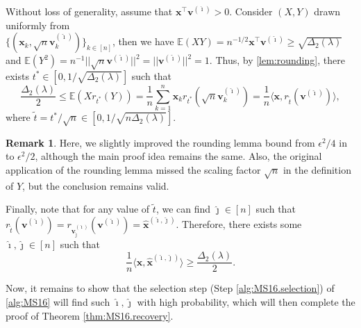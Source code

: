 \documentclass[11pt, titlepage]{article} %
\numberwithin{equation}{section}
\theoremstyle{definition}
\newtheorem{remark}{Remark}
\numberwithin{theorem}{section}
\numberwithin{lemma}{section}
\numberwithin{corollary}{section}
\numberwithin{proposition}{section}
\numberwithin{definition}{section}
\numberwithin{remark}{section}
\begin{document}
Without loss of generality, assume that $\bm{x}^\top \bm{v}^{(\hat{\imath})} > 0$. Consider $(X, Y)$ drawn uniformly from \\
$\{(\bm{x}_k, \sqrt{n}\bm{v}^{(\hat{\imath})}_k)\}_{k \in [n]}$, then
we have $\mathbb{E}(XY) = n^{-1/2} \bm{x}^\top \bm{v}^{(\hat{\imath})} \geq \sqrt{\Delta_2(\lambda)}$
and $\mathbb{E}(Y^2) = n^{-1} || \sqrt{n}\bm{v}^{(\hat{\imath})} ||^2 = || \bm{v}^{(\hat{\imath})} ||^2 = 1.$
Thus, by \cref{lem:rounding}, there exists $t^* \in [0, 1/\sqrt{\Delta_2(\lambda)}]$ such that
\[
\frac{\Delta_2(\lambda)}{2} \leq \mathbb{E}(X r_{t^*}(Y))
= \frac{1}{n} \sum_{k=1}^{n} \bm{x}_k r_{t^*}(\sqrt{n}\bm{v}^{(\hat{\imath})}_k)
= \frac{1}{n} \langle \bm{x}, r_{\tilde{t}}(\bm{v}^{(\hat{\imath})}) \rangle,
\]
where $\tilde{t} = t^*/\sqrt{n} \in [0, 1/\sqrt{n\Delta_2(\lambda)}]$. 
\begin{remark}
Here, we slightly improved the rounding lemma bound from $\epsilon^2/4$ in \cite{MS16} to $\epsilon^2/2$,
although the main proof idea remains the same. Also, the original application of the rounding lemma
missed the scaling factor $\sqrt{n}$ in the definition of $Y$, but the conclusion remains valid.
\end{remark}
Finally, note that for any value of $\tilde{t}$, we can find $\hat{\jmath} \in [n]$ such that 
$r_{\tilde{t}}(\bm{v}^{(\hat{\imath})}) = r_{\bm{v}^{(\hat{\imath})}_{\hat{\jmath}}}(\bm{v}^{(\hat{\imath})}) = \hat{\bm{x}}^{(\hat{\imath}, \hat{\jmath})}$.
Therefore, there exists some $\hat{\imath}, \hat{\jmath} \in [n]$ such that
\begin{equation}
\label{eqn:correlation}
\frac{1}{n} \langle \bm{x}, \hat{\bm{x}}^{(\hat{\imath}, \hat{\jmath})} \rangle \geq \frac{\Delta_2(\lambda)}{2}.
\end{equation}

Now, it remains to show that the selection step (Step \ref{alg:MS16.selection}) of \cref{alg:MS16}
will find such $\hat{\imath}, \hat{\jmath}$ with high probability, which will then complete the proof of Theorem \ref{thm:MS16.recovery}.
\end{document}
